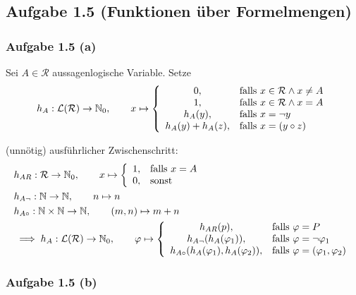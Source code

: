 \subsection{Aufgabe 1.5 (Funktionen über Formelmengen)}
\subsubsection{Aufgabe 1.5 (a)}


\begin{lösung}
	Sei $A\in\mathcal{R}$ aussagenlogische Variable. Setze
	\begin{align*}
		h_A:\mathcal{L}(\mathcal{R})\to\mathbb{N}_0,\qquad x\mapsto \left\lbrace\begin{array}{cl}
			0, & \text{falls } x\in\mathcal{R}\wedge x\neq A\\
			1, & \text{falls } x\in\mathcal{R}\wedge x=A\\
			h_A(y), & \text{falls } x=\neg y\\
			h_A(y)+h_A(z), & \text{falls } x=(y\circ z)
		\end{array}\right.
	\end{align*}
	
	(unnötig) ausführlicher Zwischenschritt:
	\begin{align*}
		&h_{AR}:\mathcal{R}\to\mathbb{N}_0,\qquad x\mapsto \left\lbrace\begin{array}{cl}
			1, & \text{falls } x= A\\
			0, & \text{sonst }
		\end{array}\right.\\
		&h_{A\neg}:\mathbb{N}\to\mathbb{N},\qquad n\mapsto n\\
		&h_{A\circ}:\mathbb{N}\times\mathbb{N}\to\mathbb{N},\qquad(m,n)\mapsto m+n\\
		&\implies h_A:\mathcal{L}(\mathcal{R})\to\mathbb{N}_0,\qquad\varphi\mapsto
		\left\lbrace\begin{array}{cl}
			h_{AR}(p), & \text{falls } \varphi=P\\
			h_{A\neg}(h_A(\varphi_1)), & \text{falls } \varphi=\neg\varphi_1\\
			h_{A\circ}(h_A(\varphi_1),h_A(\varphi_2)), &\text{falls } \varphi=(\varphi_1,\varphi_2)
		\end{array}\right.
	\end{align*}
\end{lösung}

\subsubsection{Aufgabe 1.5 (b)}

